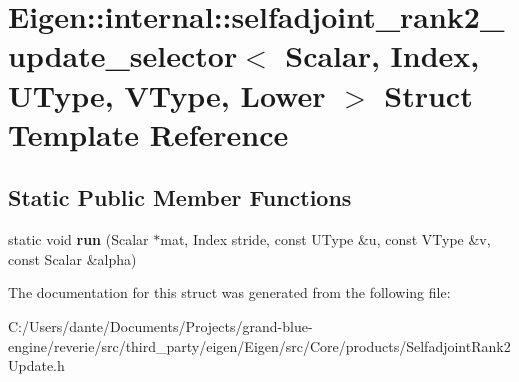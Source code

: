 \hypertarget{struct_eigen_1_1internal_1_1selfadjoint__rank2__update__selector_3_01_scalar_00_01_index_00_01_uf491e100c52e514fc778fd2dd4e730f2}{}\section{Eigen\+::internal\+::selfadjoint\+\_\+rank2\+\_\+update\+\_\+selector$<$ Scalar, Index, U\+Type, V\+Type, Lower $>$ Struct Template Reference}
\label{struct_eigen_1_1internal_1_1selfadjoint__rank2__update__selector_3_01_scalar_00_01_index_00_01_uf491e100c52e514fc778fd2dd4e730f2}
\subsection*{Static Public Member Functions}
\begin{DoxyCompactItemize}
\item 
\mbox{\label{struct_eigen_1_1internal_1_1selfadjoint__rank2__update__selector_3_01_scalar_00_01_index_00_01_uf491e100c52e514fc778fd2dd4e730f2_a4590f063ff0e7f9244f94739e1912ba4}} 
static void {\bfseries run} (Scalar $\ast$mat, Index stride, const U\+Type \&u, const V\+Type \&v, const Scalar \&alpha)
\end{DoxyCompactItemize}


The documentation for this struct was generated from the following file\+:\begin{DoxyCompactItemize}
\item 
C\+:/\+Users/dante/\+Documents/\+Projects/grand-\/blue-\/engine/reverie/src/third\+\_\+party/eigen/\+Eigen/src/\+Core/products/Selfadjoint\+Rank2\+Update.\+h\end{DoxyCompactItemize}
